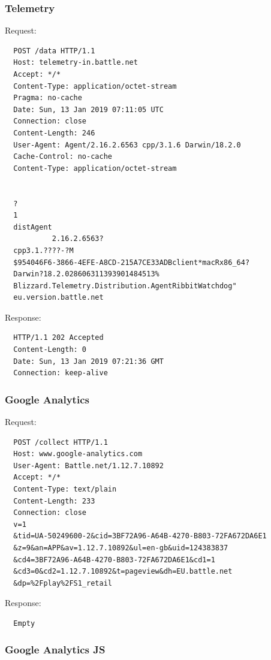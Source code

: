\documentclass[12pt]{article}
\begin{document}
\subsubsection{Telemetry}
\label{sec:telemetry}

Request:
\begin{lstlisting}
  POST /data HTTP/1.1
  Host: telemetry-in.battle.net
  Accept: */*
  Content-Type: application/octet-stream
  Pragma: no-cache
  Date: Sun, 13 Jan 2019 07:11:05 UTC
  Connection: close
  Content-Length: 246
  User-Agent: Agent/2.16.2.6563 cpp/3.1.6 Darwin/18.2.0
  Cache-Control: no-cache
  Content-Type: application/octet-stream
  
  
  ?
  1
  distAgent
           2.16.2.6563?
  cpp3.1.????-?M
  $954046F6-3866-4EFE-A8CD-215A7CE33ADBclient*macRx86_64?
  Darwin?18.2.028606311393901484513%
  Blizzard.Telemetry.Distribution.AgentRibbitWatchdog"
  eu.version.battle.net
\end{lstlisting}
Response:
\begin{lstlisting}
  HTTP/1.1 202 Accepted
  Content-Length: 0
  Date: Sun, 13 Jan 2019 07:21:36 GMT
  Connection: keep-alive  
\end{lstlisting}

\subsubsection{Google Analytics}
\label{sec:google_analytics}

Request:
\begin{lstlisting}
  POST /collect HTTP/1.1
  Host: www.google-analytics.com
  User-Agent: Battle.net/1.12.7.10892
  Accept: */*
  Content-Type: text/plain
  Content-Length: 233
  Connection: close
  v=1
  &tid=UA-50249600-2&cid=3BF72A96-A64B-4270-B803-72FA672DA6E1
  &z=9&an=APP&av=1.12.7.10892&ul=en-gb&uid=124383837
  &cd4=3BF72A96-A64B-4270-B803-72FA672DA6E1&cd1=1
  &cd3=0&cd2=1.12.7.10892&t=pageview&dh=EU.battle.net
  &dp=%2Fplay%2FS1_retail
\end{lstlisting}
Response:
\begin{lstlisting}
  Empty
\end{lstlisting}

\subsubsection{Google Analytics JS}
\label{sec:google_analytics_js}
\end{document}
